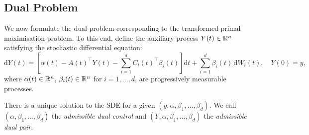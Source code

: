 \subsection{Dual Problem}

We now formulate the dual problem corresponding to the transformed primal maximisation problem. To this end, define the auxiliary process \( Y(t) \in \mathbb{R}^n \) satisfying the stochastic differential equation:
\begin{equation} \label{eq:Y_SDE}
    \mathrm{d}Y(t) = \left[ \alpha(t) - A(t)^\top Y(t) - \sum_{i=1}^d C_i(t)^\top \beta_i(t) \right] \mathrm{d}t + \sum_{i=1}^d \beta_i(t) \, \mathrm{d}W_i(t), \quad Y(0) = y,
\end{equation}
where \( \alpha(t) \in \mathbb{R}^n \), \( \beta_i(t) \in \mathbb{R}^n \) for \( i = 1, \dots, d \), are progressively measurable processes. 

There is a unique solution to the SDE for a given $(y, \alpha, \beta_1, \dots, \beta_d)$. We call $(\alpha, \beta_1, \dots, \beta_d)$ the \textit{admissible dual control} and $(Y, \alpha, \beta_1, \dots, \beta_d)$ the \textit{admissible dual pair}. 

